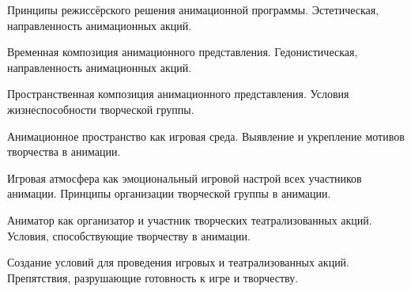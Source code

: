\documentclass[
	14pt,
	a4paper,
	]
	{scrartcl}
\begin{document}
\vfill

\newpage


\shapk
{}
\setcounter{zad}{0}

\vfill
\z Принципы режиссёрского решения анимационной программы.
 \vfill
\z Эстетическая, направленность анимационных акций.
 \vfill

\vfill

\newpage


\shapk
{}
\setcounter{zad}{0}

\vfill
\z Временная композиция анимационного представления.
 \vfill
\z Гедонистическая, направленность анимационных акций.
 \vfill

\vfill

\newpage


\shapk
{}
\setcounter{zad}{0}

\vfill
\z Пространственная композиция анимационного представления.
 \vfill
\z Условия жизнеспособности творческой группы.
 \vfill

\vfill

\newpage


\shapk
{}
\setcounter{zad}{0}

\vfill
\z Анимационное пространство как игровая среда.
 \vfill
\z Выявление и укрепление мотивов творчества в анимации.
 \vfill

\vfill

\newpage


\shapk
{}
\setcounter{zad}{0}

\vfill
\z Игровая атмосфера как эмоциональный игровой настрой всех участников анимации.
 \vfill
\z Принципы организации творческой группы в анимации.
 \vfill

\vfill

\newpage


\shapk
{}
\setcounter{zad}{0}

\vfill
\z Аниматор как организатор и участник творческих театрализованных акций. 
 \vfill
\z Условия, способствующие творчеству в анимации.
 \vfill

\vfill

\newpage


\shapk
{}
\setcounter{zad}{0}

\vfill
\z Создание условий для проведения игровых и театрализованных акций. 
 \vfill
\z Препятствия, разрушающие готовность к игре и творчеству.
 \vfill

\vfill

\newpage
\end{document}
